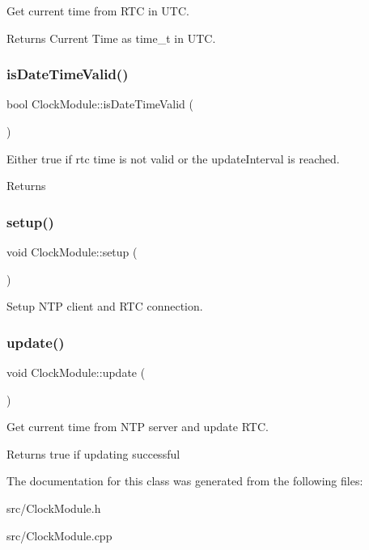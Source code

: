 Get current time from R\+TC in U\+TC. \begin{DoxyReturn}{Returns}
Current Time as time\+\_\+t in U\+TC. 
\end{DoxyReturn}
\mbox{\label{class_clock_module_a05053d7409ef43d1729113a7912fa866}} 
\subsubsection{\texorpdfstring{isDateTimeValid()}{isDateTimeValid()}}
{\footnotesize\ttfamily bool Clock\+Module\+::is\+Date\+Time\+Valid (\begin{DoxyParamCaption}{ }\end{DoxyParamCaption})}

Either true if rtc time is not valid or the update\+Interval is reached. \begin{DoxyReturn}{Returns}

\end{DoxyReturn}
\mbox{\label{class_clock_module_a6113cfe778efff0aa237696f85516796}} 
\subsubsection{\texorpdfstring{setup()}{setup()}}
{\footnotesize\ttfamily void Clock\+Module\+::setup (\begin{DoxyParamCaption}{ }\end{DoxyParamCaption})}

Setup N\+TP client and R\+TC connection. \mbox{\label{class_clock_module_afbc823bb09d912dbdc25f9d38ec78624}} 
\subsubsection{\texorpdfstring{update()}{update()}}
{\footnotesize\ttfamily void Clock\+Module\+::update (\begin{DoxyParamCaption}{ }\end{DoxyParamCaption})}

Get current time from N\+TP server and update R\+TC. \begin{DoxyReturn}{Returns}
true if updating successful 
\end{DoxyReturn}


The documentation for this class was generated from the following files\+:\begin{DoxyCompactItemize}
\item 
src/Clock\+Module.\+h\item 
src/Clock\+Module.\+cpp\end{DoxyCompactItemize}
